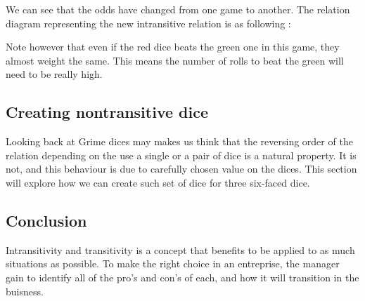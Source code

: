 \documentclass{article}
\begin{document}
    
    We can see that the odds have changed from one game to another. The relation
    diagram representing the new intransitive relation is as following :
    
    
    Note however that even if the red dice beats the green one in this game,
    they almost weight the same. This means the number of rolls to beat the
    green will need to be really high. 
    
\subsection{Creating nontransitive dice}
    
    Looking back at Grime dices may makes us think that the reversing order of
    the relation depending on the use a single or a pair of dice is a natural
    property.
    It is not, and this behaviour is due to carefully chosen value on the dices.
    This section will explore how we can create such set of dice for three
    six-faced dice.
    
\subsection{Conclusion}
    Intransitivity and transitivity is a concept that benefits to be applied to as much situations as possible.
    To make the right choice in an entreprise, the manager gain to identify all of the pro's and con's of each, and 
    how it will transition in the buisness.	
\end{document}
